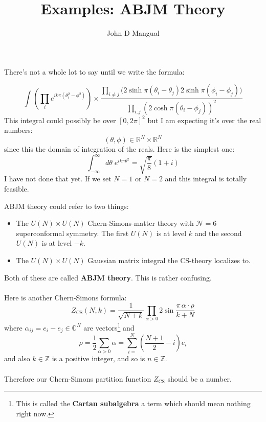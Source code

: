 \documentclass[12pt]{article}
\title{\textbf{ Examples:  ABJM Theory }}
\author{John D Mangual}
\date{}
\begin{document}
\selectfont \fontsize{25}{30}\selectfont

\maketitle

\noindent There's not a whole lot to say until we write the formula:

$$ \int \left( \prod_i e^{ik\pi (\theta_i^2 - \phi^2)} \right) \times \frac{\prod_{i \neq j}\big(2 \sinh \pi (\theta_i - \theta_j) 2 \sinh \pi (\phi_i - \phi_j)\big)}{\prod_{i,j}(2 \cosh \pi (\theta_i - \phi_j))^2} $$
This integral could possibly be over $[0, 2\pi]^2$ but I am expecting it's over the real numbers:
$$ (\theta, \phi) \in \mathbb{R}^N \times \mathbb{R}^N$$
since this the domain of integration of the reals.  Here is the simplest one:
$$ \int_{-\infty}^\infty d\theta \; e^{i k \pi \theta^2} = \sqrt{\frac{\pi}{8}} (1+i)$$
I have not done that yet.  If we set $N=1$ or $N=2$ and this integral is totally feasible.

\newpage

\noindent ABJM theory could refer to two things:
\begin{itemize}
\item The $U(N) \times U(N)$ Chern-Simons-matter theory with $\mathcal{N}=6$ superconformal symmetry.  The first $U(N)$ is at level $k$ and the second $U(N)$ is at level $-k$.
\item The $U(N) \times U(N)$ Gaussian matrix integral the CS-theory localizes to.  
\end{itemize}
Both of these are called \textbf{ABJM theory}.  This is rather confusing. \\ \\
Here is another Chern-Simons formula:
$$ Z_\text{CS} (N, k) = \frac{1}{\sqrt{N+k}} \prod_{\alpha > 0} 2 \sin \frac{\pi \,\alpha \cdot \rho}{k+N} $$
where $\alpha_{ij} = e_i - e_j \in \mathbb{C}^N$ are vectors\footnote{This is called the \textbf{Cartan subalgebra} a term which should mean nothing right now.} and 
$$ \rho = \frac{1}{2} \sum_{\alpha > 0} \alpha = \sum_{i=}^N \left(\frac{N+1}{2} - i \right) e_i $$
and also $k \in \mathbb{Z}$ is a positive integer, and so is $n \in \mathbb{Z}$. \\ \\
Therefore our Chern-Simons partition function $Z_\text{CS}$ should be a number.

\newpage

\selectfont \fontsize{12}{10}\selectfont
\end{document}
